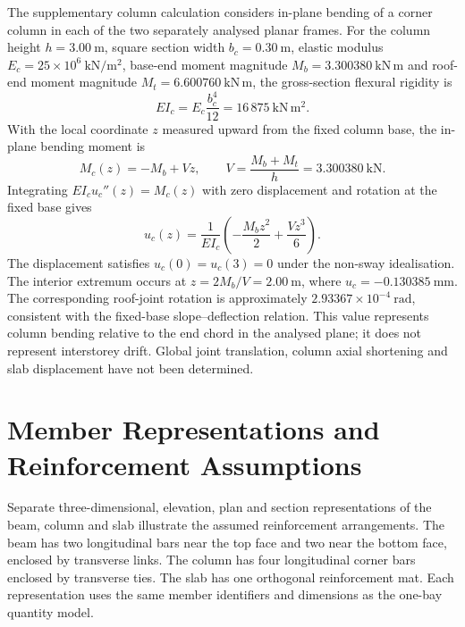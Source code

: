 The supplementary column calculation considers in-plane bending of a corner column in each of the two separately analysed planar frames. For the column height \(h=3.00~\mathrm{m}\), square section width \(b_c=0.30~\mathrm{m}\), elastic modulus \(E_c=25\times10^6~\mathrm{kN/m^2}\), base-end moment magnitude \(M_b=3.300380~\mathrm{kN\,m}\) and roof-end moment magnitude \(M_t=6.600760~\mathrm{kN\,m}\), the gross-section flexural rigidity is
\begin{equation}
EI_c=E_c\frac{b_c^4}{12}=16\,875~\mathrm{kN\,m^2}.
\end{equation}
With the local coordinate \(z\) measured upward from the fixed column base, the in-plane bending moment is
\begin{equation}
M_c(z)=-M_b+Vz,\qquad V=\frac{M_b+M_t}{h}=3.300380~\mathrm{kN}.
\end{equation}
Integrating \(EI_c u_c''(z)=M_c(z)\) with zero displacement and rotation at the fixed base gives
\begin{equation}
u_c(z)=\frac{1}{EI_c}\left(-\frac{M_bz^2}{2}+\frac{Vz^3}{6}\right).
\end{equation}
The displacement satisfies \(u_c(0)=u_c(3)=0\) under the non-sway idealisation. The interior extremum occurs at \(z=2M_b/V=2.00~\mathrm{m}\), where \(u_c=-0.130385~\mathrm{mm}\). The corresponding roof-joint rotation is approximately \(2.93367\times10^{-4}~\mathrm{rad}\), consistent with the fixed-base slope--deflection relation. This value represents column bending relative to the end chord in the analysed plane; it does not represent interstorey drift. Global joint translation, column axial shortening and slab displacement have not been determined.

\section{Member Representations and Reinforcement Assumptions}
\label{sec:onebay_member_details}

Separate three-dimensional, elevation, plan and section representations of the beam, column and slab illustrate the assumed reinforcement arrangements. The beam has two longitudinal bars near the top face and two near the bottom face, enclosed by transverse links. The column has four longitudinal corner bars enclosed by transverse ties. The slab has one orthogonal reinforcement mat. Each representation uses the same member identifiers and dimensions as the one-bay quantity model.

